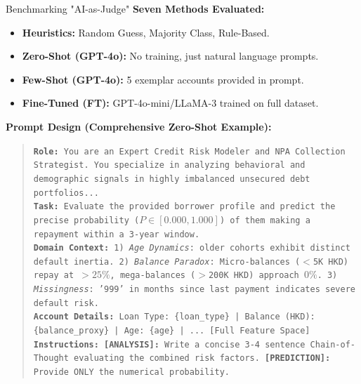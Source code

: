 \documentclass[10pt]{beamer}
\begin{document}
\begin{frame}{\textrm{Benchmarking "AI-as-Judge"}}
    \textbf{Seven Methods Evaluated:}
    \begin{itemize}
        \item \textbf{Heuristics:} Random Guess, Majority Class, Rule-Based.
        \item \textbf{Zero-Shot (GPT-4o):} No training, just natural language prompts.
        \item \textbf{Few-Shot (GPT-4o):} 5 exemplar accounts provided in prompt.
        \item \textbf{Fine-Tuned (FT):} GPT-4o-mini/LLaMA-3 trained on full dataset.
    \end{itemize}
    
    \vspace{0.2cm}
    \textbf{Prompt Design (Comprehensive Zero-Shot Example):}
    \vspace{-0.1cm}
    \begin{quote}
    \tiny %
    \texttt{\textbf{Role:} You are an Expert Credit Risk Modeler and NPA Collection Strategist. You specialize in analyzing behavioral and demographic signals in highly imbalanced unsecured debt portfolios...}\\
    \texttt{\textbf{Task:} Evaluate the provided borrower profile and predict the precise probability ($P \in [0.000, 1.000]$) of them making a repayment within a 3-year window.}\\
    \texttt{\textbf{Domain Context:} 1) \textit{Age Dynamics}: older cohorts exhibit distinct default inertia. 2) \textit{Balance Paradox}: Micro-balances ($<$5K HKD) repay at $>25\%$, mega-balances ($>$200K HKD) approach $0\%$. 3) \textit{Missingness}: '999' in months since last payment indicates severe default risk.}\\
    \texttt{\textbf{Account Details:} Loan Type: \{loan\_type\} | Balance (HKD): \{balance\_proxy\} | Age: \{age\} | ... [Full Feature Space]}\\
    \texttt{\textbf{Instructions:} \textbf{[ANALYSIS]:} Write a concise 3-4 sentence Chain-of-Thought evaluating the combined risk factors. \textbf{[PREDICTION]:} Provide ONLY the numerical probability.}
    \end{quote}
\end{frame}
\end{document}
